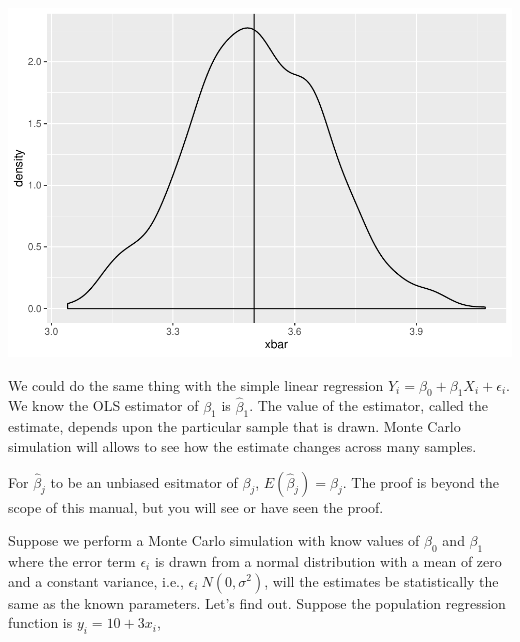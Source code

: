 \documentclass[]{book}
\begin{document}
\includegraphics{bailey_files/figure-latex/unnamed-chunk-42-1.pdf}

We could do the same thing with the simple linear regression \(Y_i = \beta_0+\beta_1X_i+\epsilon_i\). We know the OLS estimator of \(\beta_1\) is \(\hat\beta_1\). The value of the estimator, called the estimate, depends upon the particular sample that is drawn. Monte Carlo simulation will allows to see how the estimate changes across many samples.

For \(\hat\beta_j\) to be an unbiased esitmator of \(\beta_j\), \(E(\hat\beta_j) = \beta_j\). The proof is beyond the scope of this manual, but you will see or have seen the proof.

Suppose we perform a Monte Carlo simulation with know values of \(\beta_0\) and \(\beta_1\) where the error term \(\epsilon_i\) is drawn from a normal distribution with a mean of zero and a constant variance, i.e., \(\epsilon_i ~ N(0, \sigma^2)\), will the estimates be statistically the same as the known parameters. Let's find out. Suppose the population regression function is \(y_i = 10 + 3x_i\),
\end{document}
